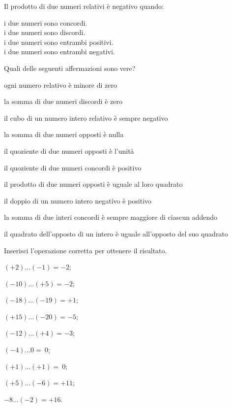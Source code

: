 \begin{esercizio}
Il prodotto di due numeri relativi è negativo quando:
 \begin{multicols}{2}
 \noindent
 \usebox\boxa\: i due numeri sono concordi.\\
 \usebox\boxb\: i due numeri sono discordi.\\
 \usebox\boxc\: i due numeri sono entrambi positivi.\\
 \usebox\boxd\: i due numeri sono entrambi negativi.
 \end{multicols}
\end{esercizio}

\begin{esercizio}
Quali delle seguenti affermazioni sono vere?
\TabPositions{12cm}
\begin{enumeratea}
 \item ogni numero relativo è minore di zero \tab\boxV\quad\boxF
 \item la somma di due numeri discordi è zero \tab\boxV\quad\boxF
 \item il cubo di un numero intero relativo è sempre negativo \tab\boxV\quad\boxF
 \item la somma di due numeri opposti è nulla \tab\boxV\quad\boxF
 \item il quoziente di due numeri opposti è l’unità \tab\boxV\quad\boxF
 \item il quoziente di due numeri concordi è positivo \tab\boxV\quad\boxF
 \item il prodotto di due numeri opposti è uguale al loro quadrato \tab\boxV\quad\boxF
 \item il doppio di un numero intero negativo è positivo \tab\boxV\quad\boxF
 \item la somma di due interi concordi è sempre maggiore di ciascun addendo \tab\boxV\quad\boxF
 \item il quadrato dell’opposto di un intero è uguale all’opposto del suo quadrato \tab\boxV\quad\boxF
\end{enumeratea}
\end{esercizio}

\begin{esercizio}
Inserisci l'operazione corretta per ottenere il risultato.
 \begin{multicols}{3}
 \begin{enumeratea}
 \item $(+2)\ldots(-1) = -2$;
 \item $(-10)\ldots(+5) = -2$;
 \item $(-18)\ldots(-19) = +1$;
 \item $(+15)\ldots(-20) = -5$;
 \item $(-12)\ldots(+4) = -3$;
 \item $(-4)\ldots0 =~0$;
 \item $(+1)\ldots(+1) =~0$;
 \item $(+5)\ldots(-6) = +11$;
 \item $-8\ldots(-2) = +16$.
 \end{enumeratea}
 \end{multicols}
\end{esercizio}


